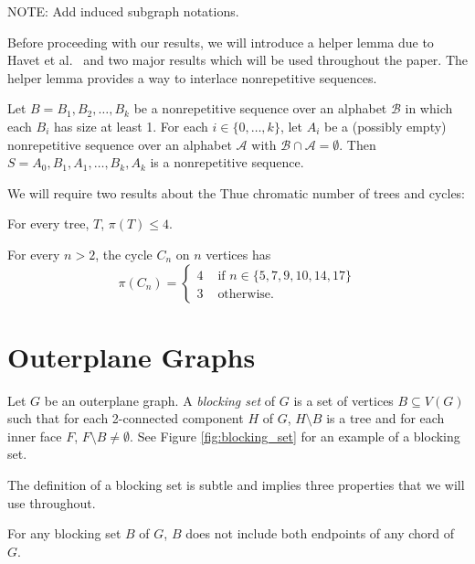 \documentclass{patmorin}
\begin{document}
NOTE: Add induced subgraph notations.


Before proceeding with our results, we will introduce a helper lemma
due to Havet et al.~\cite{havet2011facial} and two major results which
will be used throughout the paper. The helper lemma provides a way to
interlace nonrepetitive sequences.

\begin{lem}
 Let $B=B_1,B_2,\ldots,B_k$ be a nonrepetitive sequence over an alphabet $\mathcal{B}$ in which each $B_i$ has size at least 1. For each $i \in \{0,\ldots,k\}$, let $A_i$ be a (possibly empty) nonrepetitive sequence over an alphabet $\mathcal{A}$ with $\mathcal{B} \cap \mathcal{A} = \emptyset$. Then
 $S = A_0, B_1, A_1, \ldots, B_k, A_k$ is a nonrepetitive sequence.
\end{lem}

We will require two results about the Thue chromatic number of trees and cycles:

\begin{thm}
 For every tree, $T$, $\pi(T) \leq 4$.
\end{thm}

\begin{thm}
 For every $n>2$, the cycle $C_n$ on $n$ vertices has
 \[
 \pi(C_n) = \begin{cases}
             4 & \text{ if } n \in \{5,7,9,10,14,17\} \\
             3 & \text{ otherwise. }
            \end{cases}
 \]
\end{thm}

\section{Outerplane Graphs}

Let $G$ be an outerplane graph. A \emph{blocking set} of $G$ is a set
of vertices $B \subseteq V(G)$ such that for each 2-connected component
$H$ of $G$, $H \setminus B$ is a tree and for each inner face $F$,
$F \setminus B \not= \emptyset$.  See Figure \ref{fig:blocking_set}
for an example of a blocking set.

The definition of a blocking set is subtle and implies three properties
that we will use throughout.   

\begin{obs}
   For any blocking set $B$ of $G$, $B$ does not include both endpoints
   of any chord of $G$.
\end{obs}
\end{document}
